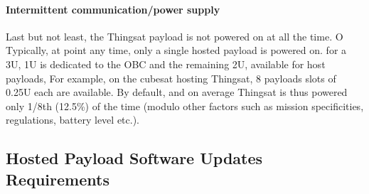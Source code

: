 \paragraph*{Intermittent communication/power supply}
Last but not least, the Thingsat payload is not powered on at all the time.
O%
Typically, at point any time, only a single hosted payload is powered on.
for a 3U, 1U is dedicated to the OBC and the remaining 2U, available for host payloads,
For example, on the cubesat hosting Thingsat, 8 payloads slots of 0.25U each are available.
By default, and on average Thingsat is thus powered only 1/8th (12.5\%) of the time
(modulo other factors such as mission specificities, regulations, battery level etc.).


\subsection{Hosted Payload Software Updates Requirements}
\label{sec:thingsat-update-req}


